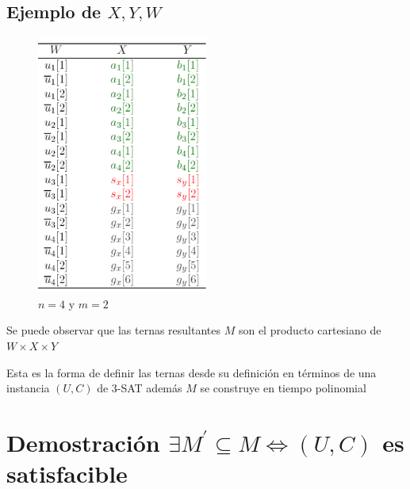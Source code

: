 \documentclass{article}
\begin{document}
\subsection{Ejemplo de $X,Y,W$}

\begin{figure}[H]
    \centering
    \includegraphics[width=0.5\textwidth]{photos/ejemplo_x_y_w_n_4_m_2.png}
    \caption{ $n=4$ y $m=2$}
    \label{fig:etiqueta}
\end{figure}

Se puede observar que las ternas resultantes $M$ son el producto cartesiano de $W \times X \times Y$

Esta es la forma de definir las ternas desde su definición en términos de una instancia $(U,C)$ de 3-SAT 
además $M$ se construye en tiempo polinomial

\section{Demostración $\exists M^{'} \subseteq M \Leftrightarrow (U,C) $ es satisfacible}
\end{document}
